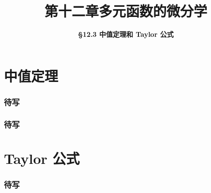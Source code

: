 \everymath{\displaystyle}



\title[第十二章\\
多元微分学]{\texorpdfstring{\LARGE \bfseries 第十二章\quad 多元函数的微分学}{第十二章 多元函数的微分学}} %
\author[\smaller \S 12.3\\
中值定理和 Taylor 公式] %
{\Large \bfseries \S 12.3 中值定理和 Taylor 公式}
\date{}





\begin{frame}

\titlepage %

\end{frame}



\section{中值定理}


\begin{frame}
\frametitle{待写}

\end{frame}


\begin{frame}
\frametitle{待写}

\end{frame}


\section{Taylor 公式}


\begin{frame}
\frametitle{待写}

\end{frame}



